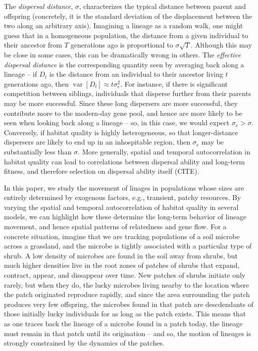 \documentclass{article}
\DeclareMathOperator{\var}{var}
\begin{document}
The \emph{dispersal distance}, $\sigma$, characterizes the typical distance between parent and offspring
(concretely, it is the standard deviation of the displacement between the two along an arbitrary axis).
Imagining a lineage as a random walk, one might guess that in a homogeneous population, 
the distance from a given individual to their ancestor from $T$ generations ago
is proportional to $\sigma \sqrt{T}$.
Although this may be close in some cases, this can be dramatically wrong in others.
The \emph{effective dispersal distance}
is the corresponding quantity seen by averaging back along a lineage --
if $D_t$ is the distance from an individual to their ancestor living $t$ generations ago,
then $\var[D_t] \approx t \sigma_e^2$.
For instance,
if there is significant competition between siblings, 
individuals that disperse further from their parents may be more successful.
Since these long dispersers are more successful, they contribute more to the modern-day gene pool,
and hence are more likely to be seen when looking back along a lineage --
so, in this case, we would expect $\sigma_e > \sigma$.
Conversely, if habitat quality is highly heterogeneous,
so that longer-distance dispersers are likely to end up in an inhospitable region,
then $\sigma_e$ may be substantially less than $\sigma$.
More generally, spatial and temporal autocorrelation in habitat quality
can lead to correlations between dispersal ability and long-term fitness,
and therefore selection on dispersal ability itself (CITE).

In this paper, we study the movement of linages in populations whose sizes
are entirely determined by exogenous factors, e.g., transient, patchy resources.
By varying the spatial and temporal autocorrelation of habitat quality in several models,
we can highlight how these determine the long-term behavior of lineage movement,
and hence spatial patterns of relatedness and gene flow.
For a concrete situation, imagine that we are tracking populations of a soil microbe
across a grassland, and the microbe is tightly associated with a particular type of shrub.
A low density of microbes are found in the soil away from shrubs,
but much higher densities live in the root zones of patches of shrubs
that expand, contract, appear, and dissappear over time.
New patches of shrubs initiate only rarely, but when they do,
the lucky microbes living nearby to the location where the patch originated reproduce rapidly, 
and since the area surrounding the patch produces very few offspring,
the microbes found in that patch are descdendants of those initially lucky individuals
for as long as the patch exists.
This means that as one traces back the lineage of a microbe found in a patch today,
the lineage must remain in that patch until its origination --
and so, the motion of lineages is strongly constrained by the dynamics of the patches.
\end{document}
